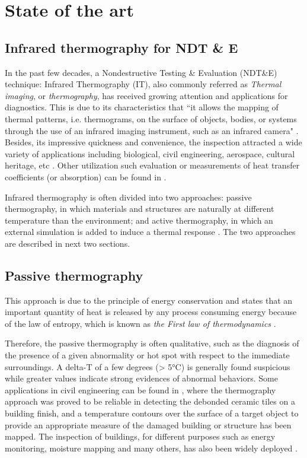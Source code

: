 \chapter{State of the art}     %

\section*{Infrared thermography for NDT \& E}
In the past few decades, a Nondestructive Testing \& Evaluation (NDT\&E) technique: Infrared Thermography (IT), also commonly referred as \textit{Thermal imaging}, or \textit{thermography}, has received growing attention and applications for diagnostics. This is due to its characteristics that ``it allows the mapping of thermal patterns, i.e. thermograms, on the surface of objects, bodies, or systems through the use of an infrared imaging instrument, such as an infrared camera" \citep{maldague3introduction}. Besides, its impressive quickness and convenience, the inspection attracted a wide variety of applications including biological, civil engineering, aerospace, cultural heritage, etc \citep{2007-Ibarra-Castanedo,2000-Li,cielo1987thermographie,shoja2011inspection,pradere2009microscale,avdelidis2004applications,maierhofer2005quantitative}. Other utilization such evaluation or measurements of heat transfer coefficients (or absorption) can be found in \citep{dragano2009experimental,grinzato2010r,grinzatoquality,grinzato1comparison,rossi2009k}.

Infrared thermography is often divided into two approaches: passive thermography, in which materials and structures are naturally at different temperature than the environment; and active thermography, in which an external simulation is added to induce a thermal response \citep{Maldague2001theory}. The two approaches are described in next two sections.
\section{Passive thermography}
This approach is due to the principle of energy conservation and states that an important quantity of heat is released by any process consuming energy because of the law of entropy, which is known as \textit{the First law of thermodynamics} \citep{thdy1}. 

Therefore, the passive thermography is often qualitative, such as the diagnosis of the presence of a given abnormality or hot spot with respect to the immediate surroundings.  A delta-T of a few degrees (> 5°C) is generally
found suspicious while greater values indicate strong evidences of abnormal behaviors. Some applications in civil engineering can be found in \citep{2000-Li,stanley1994non,lo2004building}, where the thermography approach was proved to be reliable in detecting the debonded ceramic tiles on a building finish, and a temperature contours over the surface of a target object to provide an appropriate measure of the damaged building or structure has been mapped. The inspection of buildings, for different purposes such as energy monitoring, moisture mapping and many others, has also been widely deployed \citep{laranjeirapassive,bison1993automatic,bison2012geometrical}. 

